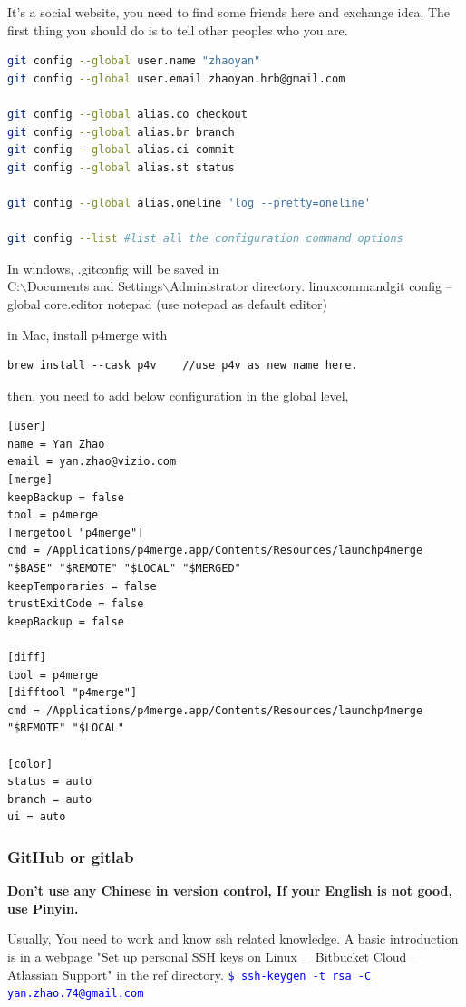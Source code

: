 \documentclass[paper=8.5in:11in, twoside, 12pt, pagesize=pdftex]{book}
\newcommand{\linuxcommand}[1]{\texttt{\textcolor{blue}{\$ #1 \Pisymbol{psy}{191}}}}
\begin{document}
It's a social website, you need to find some friends here and exchange idea. The first thing you should do is to tell other peoples who you are.  
\begin{lstlisting}[language=bash]
git config --global user.name "zhaoyan"
git config --global user.email zhaoyan.hrb@gmail.com

git config --global alias.co checkout
git config --global alias.br branch
git config --global alias.ci commit
git config --global alias.st status

git config --global alias.oneline 'log --pretty=oneline'

git config --list #list all the configuration command options
\end{lstlisting}	
	
	In windows, .gitconfig will be saved in  \\
	C:$\backslash$Documents and Settings$\backslash$Administrator directory. linuxcommand{git config --global core.editor notepad} (use notepad as default editor)
	
	
	in Mac, install p4merge with  
\begin{lstlisting}
brew install --cask p4v    //use p4v as new name here. 
\end{lstlisting}
then, you need to add below configuration in the global level,  
	
\begin{lstlisting}
[user]
name = Yan Zhao
email = yan.zhao@vizio.com
[merge]
keepBackup = false
tool = p4merge
[mergetool "p4merge"]
cmd = /Applications/p4merge.app/Contents/Resources/launchp4merge "$BASE" "$REMOTE" "$LOCAL" "$MERGED"
keepTemporaries = false
trustExitCode = false
keepBackup = false

[diff]
tool = p4merge
[difftool "p4merge"]
cmd = /Applications/p4merge.app/Contents/Resources/launchp4merge "$REMOTE" "$LOCAL"

[color]
status = auto
branch = auto
ui = auto
\end{lstlisting}
	
	

\subsubsection{GitHub or gitlab}
	\textbf{Don't use any Chinese in version control, If your English is not good, use Pinyin.}
	

	Usually, You need to work and know ssh related knowledge. A basic introduction is in a webpage "Set up personal SSH keys on Linux \_ Bitbucket Cloud \_ Atlassian Support" in the ref directory. \linuxcommand{ssh-keygen -t rsa -C yan.zhao.74@gmail.com} 
	
\end{document}
